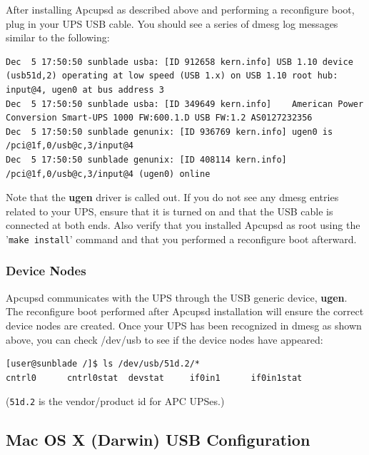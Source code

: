 After installing Apcupsd as described above and performing a reconfigure boot,
plug in your UPS USB cable. You should see a series of dmesg log messages similar
to the following: 

\begin{verbatim}
Dec  5 17:50:50 sunblade usba: [ID 912658 kern.info] USB 1.10 device (usb51d,2) operating at low speed (USB 1.x) on USB 1.10 root hub: input@4, ugen0 at bus address 3
Dec  5 17:50:50 sunblade usba: [ID 349649 kern.info]    American Power Conversion Smart-UPS 1000 FW:600.1.D USB FW:1.2 AS0127232356
Dec  5 17:50:50 sunblade genunix: [ID 936769 kern.info] ugen0 is /pci@1f,0/usb@c,3/input@4
Dec  5 17:50:50 sunblade genunix: [ID 408114 kern.info] /pci@1f,0/usb@c,3/input@4 (ugen0) online
\end{verbatim}

Note that the {\bf ugen} driver is called out. If you do not see any dmesg entries
related to your UPS, ensure that it is turned on and that the USB cable is connected
at both ends. Also verify that you installed Apcupsd as root using the 
'\texttt{make install}' command and that you performed a reconfigure boot afterward.

\subsubsection*{Device Nodes}

Apcupsd communicates with the UPS through the USB generic device, {\bf ugen}.
The reconfigure boot performed after Apcupsd installation will ensure the
correct device nodes are created. Once your UPS has been recognized in dmesg
as shown above, you can check /dev/usb to see if the device nodes have appeared:

\begin{verbatim}
[user@sunblade /]$ ls /dev/usb/51d.2/*
cntrl0      cntrl0stat  devstat     if0in1      if0in1stat
\end{verbatim}

(\texttt{51d.2} is the vendor/product id for APC UPSes.)

\label{Darwin USB Configuration}
\subsection*{Mac OS X (Darwin) USB Configuration}

